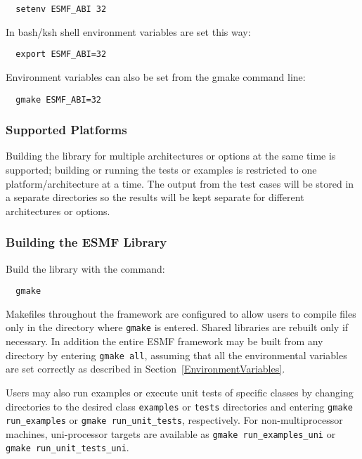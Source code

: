 \begin{verbatim}
  setenv ESMF_ABI 32
\end{verbatim}

In bash/ksh shell environment variables are set this way:

\begin{verbatim}
  export ESMF_ABI=32
\end{verbatim}

Environment variables can also be set from the gmake command line:

\begin{verbatim}
  gmake ESMF_ABI=32
\end{verbatim}

\subsubsection{Supported Platforms}


Building the library for multiple architectures or options at the same
time is supported; building or running the tests or examples is restricted
to one platform/architecture at a time.  The output from the test cases
will be stored in a separate directories so the results will be kept 
separate for different architectures or options.

\subsubsection{Building the ESMF Library}
\label{BuildESMF}



Build the library with the command:
\begin{verbatim}
  gmake 
\end{verbatim}


Makefiles throughout the framework are configured to allow users to
compile files only in the directory where {\tt gmake} is entered. Shared
libraries are rebuilt only if necessary. In addition the entire ESMF
framework may be built from any directory by entering {\tt gmake all},
assuming that all the environmental variables are set correctly as
described in Section~\ref{EnvironmentVariables}.

Users may also run examples or execute unit tests of specific classes
by changing directories to the desired class {\tt examples} or {\tt tests} 
directories and entering {\tt gmake run\_examples} or 
{\tt gmake run\_unit\_tests}, respectively.  For non-multiprocessor machines,
uni-processor targets are available as {\tt gmake run\_examples\_uni} or
{\tt gmake run\_unit\_tests\_uni}.


